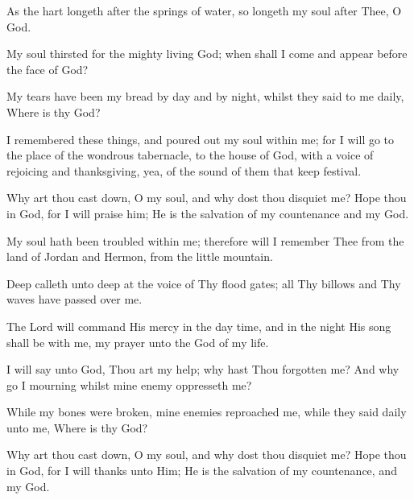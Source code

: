As the hart longeth after the springs of water, so longeth my soul after Thee, O God.

My soul thirsted for the mighty living God; when shall I come and appear before the face of God?

My tears have been my bread by day and by night, whilst they said to me daily, Where is thy God?

I remembered these things, and poured out my soul within me; for I will go to the place of the wondrous tabernacle, to the house of God, with a voice of rejoicing and thanksgiving, yea, of the sound of them that keep festival.

Why art thou cast down, O my soul, and why dost thou disquiet me? Hope thou in God, for I will praise him; He is the salvation of my countenance and my God.

My soul hath been troubled within me; therefore will I remember Thee from the land of Jordan and Hermon, from the little mountain.

Deep calleth unto deep at the voice of Thy flood gates; all Thy billows and Thy waves have passed over me.

The Lord will command His mercy in the day time, and in the night His song shall be with me, my prayer unto the God of my life.

I will say unto God, Thou art my help; why hast Thou forgotten me? And why go I mourning whilst mine enemy oppresseth me?

While my bones were broken, mine enemies reproached me, while they said daily unto me, Where is thy God?

Why art thou cast down, O my soul, and why dost thou disquiet me? Hope thou in God, for I will thanks unto Him; He is the salvation of my countenance, and my God.
